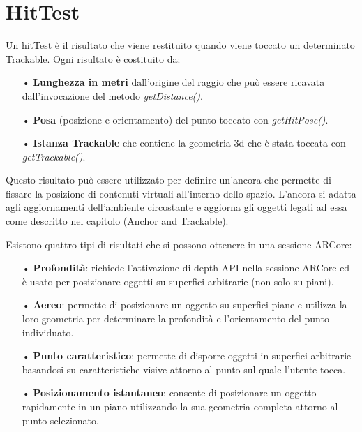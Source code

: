 \documentclass[crop=false, class=book]{standalone}
\begin{document}
	\chapter{HitTest}
	
	Un hitTest è il risultato che viene restituito quando viene toccato un determinato Trackable.
	Ogni risultato è costituito da:
	\begin{itemize}
		\item[•] \textbf{Lunghezza in metri} dall'origine del raggio che può essere ricavata dall'invocazione del metodo \emph{getDistance()}.
		\item[•] \textbf{Posa} (posizione e orientamento) del punto toccato con \emph{getHitPose()}.
		\item[•] \textbf{Istanza Trackable} che contiene la geometria 3d che è stata toccata con \emph{getTrackable()}.
	\end{itemize}
	
	\begin{flushleft}
	Questo risultato può essere utilizzato per definire un'ancora che permette di fissare la posizione di 							contenuti virtuali all'interno dello spazio. L'ancora si adatta agli aggiornamenti dell'ambiente circostante e aggiorna gli 	oggetti legati ad essa come descritto nel capitolo (Anchor and Trackable).\\
	\end{flushleft}	
		Esistono quattro tipi di risultati che si possono ottenere in una sessione ARCore:
		\begin{itemize}
		\item[•] \textbf{Profondità}: richiede l'attivazione di depth API nella sessione ARCore ed è usato per posizionare oggetti su superfici arbitrarie (non solo su piani).
		\item[•]\textbf{Aereo}: permette di posizionare un oggetto su superfici piane e utilizza la loro geometria per determinare la profondità e l'orientamento del punto individuato.
		\item[•] \textbf{Punto caratteristico}: permette di disporre oggetti in superfici arbitrarie basandosi su caratteristiche visive attorno al punto sul quale l'utente tocca. 
		\item[•] \textbf{Posizionamento istantaneo}: consente di posizionare un oggetto rapidamente in un piano utilizzando la sua geometria completa attorno al punto selezionato. 
	\end{itemize}
	\clearpage
	
\end{document}
